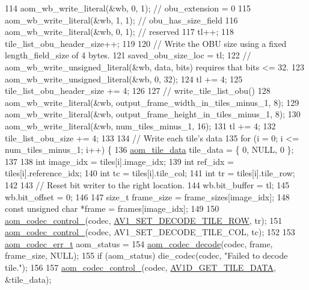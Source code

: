 \begin{DoxyCodeInclude}
{114   aom\_wb\_write\_literal(&wb, 0, 1);  \textcolor{comment}{// obu\_extension = 0}
115   aom\_wb\_write\_literal(&wb, 1, 1);  \textcolor{comment}{// obu\_has\_size\_field}
116   aom\_wb\_write\_literal(&wb, 0, 1);  \textcolor{comment}{// reserved}
117   tl++;
118   tile\_list\_obu\_header\_size++;
119 
120   \textcolor{comment}{// Write the OBU size using a fixed length\_field\_size of 4 bytes.}
121   saved\_obu\_size\_loc = tl;
122   \textcolor{comment}{// aom\_wb\_write\_unsigned\_literal(&wb, data, bits) requires that bits <= 32.}
123   aom\_wb\_write\_unsigned\_literal(&wb, 0, 32);
124   tl += 4;
125   tile\_list\_obu\_header\_size += 4;
126 
127   \textcolor{comment}{// write\_tile\_list\_obu()}
128   aom\_wb\_write\_literal(&wb, output\_frame\_width\_in\_tiles\_minus\_1, 8);
129   aom\_wb\_write\_literal(&wb, output\_frame\_height\_in\_tiles\_minus\_1, 8);
130   aom\_wb\_write\_literal(&wb, num\_tiles\_minus\_1, 16);
131   tl += 4;
132   tile\_list\_obu\_size += 4;
133 
134   \textcolor{comment}{// Write each tile's data}
135   \textcolor{keywordflow}{for} (i = 0; i <= num\_tiles\_minus\_1; i++) \{
136     \hyperlink{structaom__tile__data}{aom\_tile\_data} tile\_data = \{ 0, NULL, 0 \};
137 
138     \textcolor{keywordtype}{int} image\_idx = tiles[i].image\_idx;
139     \textcolor{keywordtype}{int} ref\_idx = tiles[i].reference\_idx;
140     \textcolor{keywordtype}{int} tc = tiles[i].tile\_col;
141     \textcolor{keywordtype}{int} tr = tiles[i].tile\_row;
142 
143     \textcolor{comment}{// Reset bit writer to the right location.}
144     wb.bit\_buffer = tl;
145     wb.bit\_offset = 0;
146 
147     \textcolor{keywordtype}{size\_t} frame\_size = frame\_sizes[image\_idx];
148     \textcolor{keyword}{const} \textcolor{keywordtype}{unsigned} \textcolor{keywordtype}{char} *frame = frames[image\_idx];
149 
150     \hyperlink{group__codec_ga51eb332a40dcacc39000ab8e0be36b79}{aom\_codec\_control\_}(codec, \hyperlink{group__aom__decoder_gga3865fd4b3192489baa9a5c3632ebe97bac056b4cf80427fd05e3c4c9fc46edb78}{AV1\_SET\_DECODE\_TILE\_ROW}, tr);
151     \hyperlink{group__codec_ga51eb332a40dcacc39000ab8e0be36b79}{aom\_codec\_control\_}(codec, AV1\_SET\_DECODE\_TILE\_COL, tc);
152 
153     \hyperlink{group__codec_gaaae61e0f8663e6137f1e228757248e7c}{aom\_codec\_err\_t} aom\_status =
154         \hyperlink{group__decoder_gab03fdb999d1f83a5896869a3ba5f68f7}{aom\_codec\_decode}(codec, frame, frame\_size, NULL);
155     \textcolor{keywordflow}{if} (aom\_status) die\_codec(codec, \textcolor{stringliteral}{"Failed to decode tile."});
156 
157     \hyperlink{group__codec_ga51eb332a40dcacc39000ab8e0be36b79}{aom\_codec\_control\_}(codec, \hyperlink{group__aom__decoder_gga3865fd4b3192489baa9a5c3632ebe97badf1e96275f692bc97ddb4ce2fbdb456e}{AV1D\_GET\_TILE\_DATA}, &tile\_data);
}
\end{DoxyCodeInclude}
